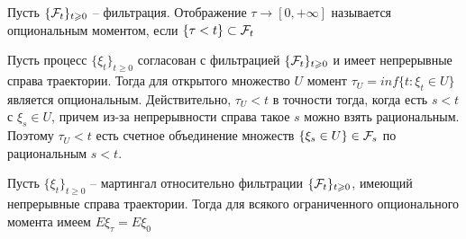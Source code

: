 \begin{definition}
    Пусть $\{\mathcal{F}_t\}_{t \geqslant 0}$ -- фильтрация. Отображение $\tau \to [0, +\infty]$ называется опциональным моментом, если $\{\tau < t\} \subset \mathcal{F}_t$
\end{definition}

\begin{example}
    Пусть процесс $\{\xi_t\}_{t \geq 0}$ согласован с фильтрацией $\{\mathcal{F}_t\}_{t \geqslant 0}$ и имеет непрерывные справа траектории. Тогда для открытого множество $U$ момент $\tau_U = inf\{t : \xi_t \in U\}$ является опциональным. Действительно, $\tau_U < t$ в точности тогда, когда есть $s < t$ с $\xi_s \in U$, причем из-за непрерывности справа такое $s$ можно взять рациональным. Поэтому $\tau_U < t$ есть счетное объединение множеств $\{\xi_s \in U\} \in \mathcal{F}_s$ по рациональным $s < t$.
\end{example}

\begin{theorem}
    Пусть $\{\xi_t\}_{t \geq 0}$ -- мартингал относительно фильтрации $\{\mathcal{F}_t\}_{t \geqslant 0}$, имеющий непрерывные справа траектории. Тогда для всякого ограниченного опционального момента имеем $E \xi_{\tau} = E \xi_0$
\end{theorem}